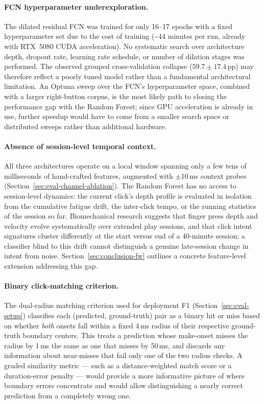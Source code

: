 \paragraph{FCN hyperparameter underexploration.}
The dilated residual FCN was trained for only 16--17 epochs with a fixed
hyperparameter set due to the cost of training (\textasciitilde44 minutes per
run, already with RTX~5080 CUDA acceleration). No systematic search over
architecture depth, dropout rate, learning rate schedule, or number of dilation
stages was performed. The observed grouped cross-validation collapse
($59.7 \pm 17.4$\,pp) may therefore reflect a poorly tuned model rather than a
fundamental architectural limitation. An Optuna sweep over the FCN's
hyperparameter space, combined with a larger right-button corpus, is the most
likely path to closing the performance gap with the Random Forest; since GPU
acceleration is already in use, further speedup would have to come from a
smaller search space or distributed sweeps rather than additional hardware.

\paragraph{Absence of session-level temporal context.}
All three architectures operate on a local window spanning only a few tens of
milliseconds of hand-crafted features, augmented with $\pm$10\,ms context probes
(Section~\ref{sec:eval-channel-ablation}). The Random Forest has no access to
session-level dynamics: the current click's depth profile is evaluated in isolation
from the cumulative fatigue drift, the inter-click tempo, or the running statistics
of the session so far. Biomechanical research suggests that finger press depth and
velocity evolve systematically over extended play sessions, and that click intent
signatures cluster differently at the start versus end of a 40-minute session; a
classifier blind to this drift cannot distinguish a genuine late-session change in
intent from noise. Section~\ref{sec:conclusion-fw} outlines a concrete feature-level
extension addressing this gap.

\paragraph{Binary click-matching criterion.}
The dual-radius matching criterion used for deployment F1 (Section~\ref{sec:eval-setup})
classifies each (predicted, ground-truth) pair as a binary hit or miss based on whether
\emph{both} onsets fall within a fixed 4\,ms radius of their respective ground-truth
boundary centers. This treats a prediction whose make-onset misses the radius by 1\,ms
the same as one that misses by 50\,ms, and discards any information about near-misses
that fail only one of the two radius checks. A graded similarity metric --- such as a
distance-weighted match score or a duration-error penalty --- would provide a more
informative picture of where boundary errors concentrate and would allow distinguishing
a nearly correct prediction from a completely wrong one.

